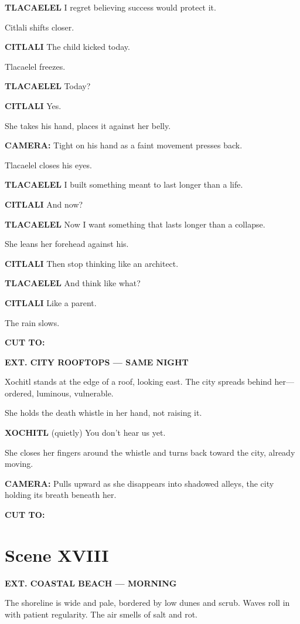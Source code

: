 \documentclass[12pt]{article}
\begin{document}
\textbf{TLACAELEL}  
I regret believing success would protect it.

Citlali shifts closer.

\textbf{CITLALI}  
The child kicked today.

Tlacaelel freezes.

\textbf{TLACAELEL}  
Today?

\textbf{CITLALI}  
Yes.

She takes his hand, places it against her belly.

\textbf{CAMERA:} Tight on his hand as a faint movement presses back.

Tlacaelel closes his eyes.

\textbf{TLACAELEL}  
I built something meant to last  
longer than a life.

\textbf{CITLALI}  
And now?

\textbf{TLACAELEL}  
Now I want something that lasts  
longer than a collapse.

She leans her forehead against his.

\textbf{CITLALI}  
Then stop thinking like an architect.

\textbf{TLACAELEL}  
And think like what?

\textbf{CITLALI}  
Like a parent.

The rain slows.

\textbf{CUT TO:}

\textbf{EXT. CITY ROOFTOPS — SAME NIGHT}

Xochitl stands at the edge of a roof, looking east. The city spreads behind her—ordered, luminous, vulnerable.

She holds the death whistle in her hand, not raising it.

\textbf{XOCHITL}  
(quietly)  
You don’t hear us yet.

She closes her fingers around the whistle and turns back toward the city, already moving.

\textbf{CAMERA:} Pulls upward as she disappears into shadowed alleys, the city holding its breath beneath her.

\textbf{CUT TO:}

\section*{Scene XVIII}

\textbf{EXT. COASTAL BEACH — MORNING}

The shoreline is wide and pale, bordered by low dunes and scrub. Waves roll in with patient regularity. The air smells of salt and rot.
\end{document}
